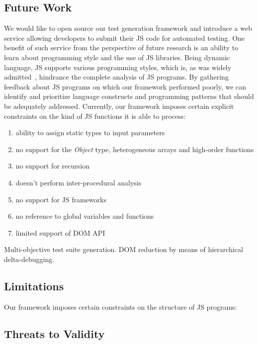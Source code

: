 \documentclass[sigconf,review,anonymous]{acmart}
\begin{document}
\subsection{Future Work}
\label{sub.sec.fut.work}

We would like to open source our test generation framework and introduce a web service allowing developers to submit their JS code for automated testing. One benefit of such service from the perspective of future research is an ability to learn about programming style and the use of JS libraries. Being dynamic language, JS supports various programming styles, which is, as was widely admitted~\cite{paper}, hindrance the complete analysis of JS programs. By gathering feedback about JS programs on which our framework performed poorly, we can identify and prioritize language constructs and programming patterns that should be adequately addressed. Currently, our framework imposes certain explicit constraints on the kind of JS functions it is able to process: 
\begin{enumerate}
\item ability to assign static types to input parameters 
\item no support for the \emph{Object} type, heterogeneous arrays and high-order functions
\item no support for recursion
\item doesn't perform inter-procedural analysis
\item no support for JS frameworks
\item no reference to global variables and functions
\item limited support of DOM API     
\end{enumerate}

Multi-objective test suite generation. DOM reduction by means of hierarchical delta-debugging.

\subsection{Limitations}
\label{sub.sec.eval.limit}

Our framework imposes certain constraints on the structure of JS programs:

\subsection{Threats to Validity}
\label{sub.sec.thhreats}
\end{document}
